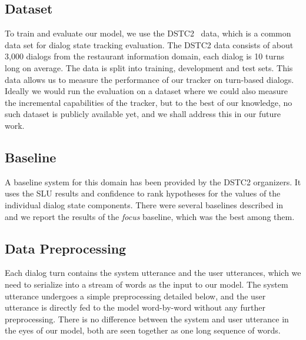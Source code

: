 \documentclass[11pt,twocolumn]{article}
\begin{document}
\subsection{Dataset}
To train and evaluate our model, we use the DSTC2~\cite{henderson2014second} data, which is a common data set for dialog state tracking evaluation. The DSTC2 data consists of about 3,000 dialogs from the restaurant information domain, each dialog is 10 turns long on average. The data is split into training, development and test sets. This data allows us to measure the performance of our tracker on turn-based dialogs. Ideally we would run the evaluation on a dataset where we could also measure the incremental capabilities of the tracker, but to the best of our knowledge, no such dataset is publicly available yet, and we shall address this in our future work.

\subsection{Baseline}
A baseline system for this domain has been provided by the DSTC2 organizers. It uses the SLU results and confidence to rank hypotheses for the values of the individual dialog state components. There were several baselines described in~\cite{henderson2014second} and we report the results of the \emph{focus} baseline, which was the best among them.

\subsection{Data Preprocessing}
Each dialog turn contains the system utterance and the user utterances, which we need to serialize into a stream of words as the input to our model. The system utterance undergoes a simple preprocessing detailed below, and the user utterance is directly fed to the model word-by-word without any further preprocessing. There is no difference between the system and user utterance in the eyes of our model, both are seen together as one long sequence of words.
\end{document}
